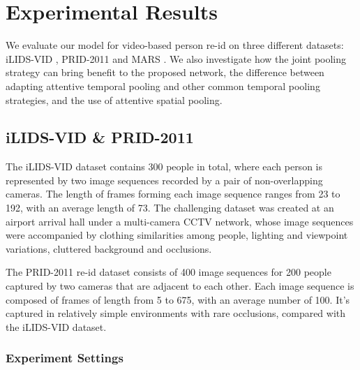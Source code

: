 \documentclass[10pt,twocolumn,letterpaper]{article}
\begin{document}
\section{Experimental Results}

We evaluate our model for video-based person re-id on three different datasets: iLIDS-VID \cite{video_ranking}, PRID-2011 \cite{PRID} and MARS \cite{MARS}. We also investigate how the joint pooling strategy can bring benefit to the proposed network, the difference between adapting attentive temporal pooling and other common temporal pooling strategies, and the use of attentive spatial pooling.  

\subsection{iLIDS-VID \& PRID-2011}

The iLIDS-VID dataset \cite{video_ranking} contains 300 people in total, where each person is represented by two image sequences recorded by a pair of non-overlapping cameras. The length of frames forming each image sequence ranges from 23 to 192, with an average length of 73.  The challenging dataset was created at an airport arrival hall under a multi-camera CCTV network, whose image sequences were accompanied by clothing similarities among people, lighting and viewpoint variations, cluttered background and occlusions.
 
The PRID-2011 re-id dataset \cite{PRID} consists of 400 image sequences for 200 people captured by two cameras that are adjacent to each other. Each image sequence is composed of frames of length from 5 to 675, with an average number of 100. It's captured in relatively simple environments with rare occlusions, compared with the iLIDS-VID dataset. 
   
\subsubsection{Experiment Settings}
     
\end{document}
